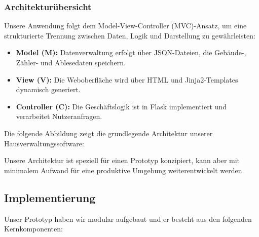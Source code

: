 \subsubsection{Architekturübersicht}

Unsere Anwendung folgt dem Model-View-Controller (MVC)-Ansatz, um eine strukturierte Trennung zwischen Daten, Logik und Darstellung zu gewährleisten:
\begin{itemize}
    \item \textbf{Model (M):} Datenverwaltung erfolgt über JSON-Dateien, die Gebäude-, Zähler- und Ablesedaten speichern.
    \item \textbf{View (V):} Die Weboberfläche wird über HTML und Jinja2-Templates dynamisch generiert.
    \item \textbf{Controller (C):} Die Geschäftslogik ist in Flask implementiert und verarbeitet Nutzeranfragen.
\end{itemize}

Die folgende Abbildung zeigt die grundlegende Architektur unserer Hausverwaltungssoftware:


Unsere Architektur ist speziell für einen Prototyp konzipiert, kann aber mit minimalem Aufwand für eine produktive Umgebung weiterentwickelt werden.

\subsection{Implementierung}\label{subsec:implementierung}

Unser Prototyp haben wir modular aufgebaut und er besteht aus den folgenden Kernkomponenten:

